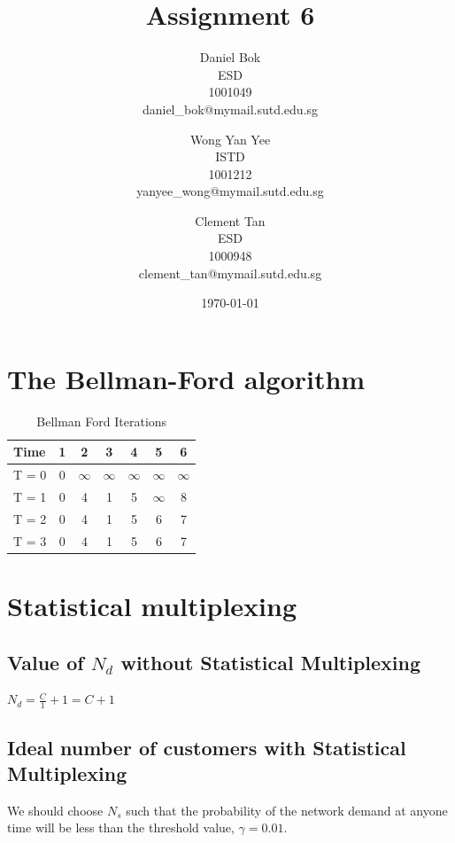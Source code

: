 \documentclass[]{article}
\title{Assignment 6}
\author{
	Daniel Bok \\
	ESD \\
	1001049 \\
	daniel\_bok@mymail.sutd.edu.sg 
	\and
	Wong Yan Yee\\ 
	ISTD \\
	1001212 \\
	yanyee\_wong@mymail.sutd.edu.sg
	\and
	Clement Tan \\
	ESD \\
	1000948 \\
	clement\_tan@mymail.sutd.edu.sg
}
\date{\today}
\begin{document}
	
\maketitle
	
\section{The Bellman-Ford algorithm}

\begin{table}[htbp]
	\centering
	\caption{Bellman Ford Iterations}
	\begin{tabular}{|lcccccc|}
    \toprule
	\rowcolor[rgb]{ .267,  .447,  .769} \textcolor[rgb]{ 1,  1,  1}{\textbf{Time}} & \textcolor[rgb]{ 1,  1,  1}{\textbf{1}} & \textcolor[rgb]{ 1,  1,  1}{\textbf{2}} & \textcolor[rgb]{ 1,  1,  1}{\textbf{3}} & \textcolor[rgb]{ 1,  1,  1}{\textbf{4}} & \textcolor[rgb]{ 1,  1,  1}{\textbf{5}} & \textcolor[rgb]{ 1,  1,  1}{\textbf{6}} \\
	\midrule
	T = 0 & 0     & $\infty$ & $\infty$ & $\infty$ & $\infty$ & $\infty$ \\
	\midrule
	T = 1 & 0     & 4     & 1     & 5     & $\infty$ & 8 \\
	\midrule
	T = 2 & 0     & 4     & 1     & 5     & 6     & 7 \\
	\midrule
	T = 3 & 0     & 4     & 1     & 5     & 6     & 7 \\
	\bottomrule
	\end{tabular}
	\label{tab:bellman-ford}
\end{table}

\section{Statistical multiplexing}

\subsection{Value of $N_d$ without Statistical Multiplexing}
$N_d = \frac{C}{1} + 1 = C + 1$

\subsection{Ideal number of customers with Statistical Multiplexing}

We should choose $N_s$ such that the probability of the network demand at anyone time will be less than the threshold value, $\gamma = 0.01$.
\end{document}
